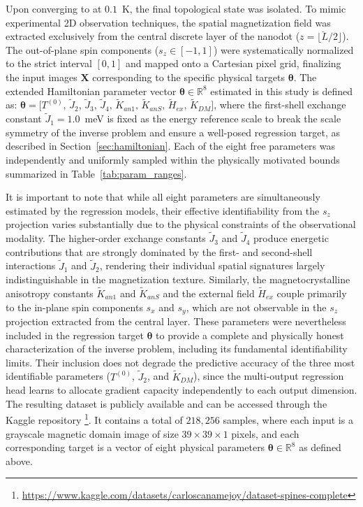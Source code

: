 \documentclass[final,5p,times,twocolumn]{elsarticle}
\begin{document}
Upon converging to  at $0.1$~K, 
the final topological state was isolated. To mimic 
experimental 2D observation techniques, the spatial 
magnetization field was extracted exclusively from the 
central discrete layer of the nanodot 
($z = \lfloor \breve{L}/2 \rfloor$). The out-of-plane 
spin components ($s_z \in [-1, 1]$) were systematically 
normalized to the strict interval $[0, 1]$ and mapped 
onto a Cartesian pixel grid, finalizing the input images 
$\mathbf{X}$ corresponding to the specific physical 
targets $\boldsymbol{\theta}$. The extended Hamiltonian 
parameter vector $\boldsymbol{\theta} \in \mathbb{R}^8$ 
estimated in this study is defined as:
$\boldsymbol{\theta} = \bigl[T^{(0)},\, \tilde{J}_2,\, 
\tilde{J}_3,\, \tilde{J}_4,\, \tilde{K}_{an1},\, 
\tilde{K}_{anS},\, \tilde{H}_{ex},\, 
\tilde{K}_{DM}\bigr]$,
where the first-shell exchange constant $\tilde{J}_1 = 
1.0$~meV is fixed as the energy reference scale to 
break the scale symmetry of the inverse problem and 
ensure a well-posed regression target, as described 
in Section~\ref{sec:hamiltonian}. Each of the eight 
free parameters was independently and uniformly sampled 
within the physically motivated bounds summarized in 
Table~\ref{tab:param_ranges}.

It is important to note that while all eight parameters 
are simultaneously estimated by the regression models, 
their effective identifiability from the $s_z$ 
projection varies substantially due to the physical 
constraints of the observational modality. The 
higher-order exchange constants $\tilde{J}_3$ and 
$\tilde{J}_4$ produce energetic contributions that are 
strongly dominated by the first- and second-shell 
interactions $\tilde{J}_1$ and $\tilde{J}_2$, rendering 
their individual spatial signatures largely 
indistinguishable in the magnetization texture. Similarly, 
the magnetocrystalline anisotropy constants 
$\tilde{K}_{an1}$ and $\tilde{K}_{anS}$ and the 
external field $\tilde{H}_{ex}$ couple primarily to 
the in-plane spin components $s_x$ and $s_y$, which 
are not observable in the $s_z$ projection extracted 
from the central layer. These parameters were 
nevertheless included in the regression target 
$\boldsymbol{\theta}$ to provide a complete and 
physically honest characterization of the inverse 
problem, including its fundamental identifiability 
limits. Their inclusion does not degrade the 
predictive accuracy of the three most identifiable 
parameters ($T^{(0)}$, $\tilde{J}_2$, and 
$\tilde{K}_{DM}$), since the multi-output regression 
head learns to allocate gradient capacity independently 
to each output dimension. The resulting dataset is 
publicly available and can be accessed through the 
Kaggle repository%
\footnote{\url{https://www.kaggle.com/datasets/carloscanamejoy/dataset-spines-complete}}. 
It contains a total of $218{,}256$ samples, where 
each input is a grayscale magnetic domain image of 
size $39 \times 39 \times 1$ pixels, and each 
corresponding target is a vector of eight physical 
parameters $\boldsymbol{\theta} \in \mathbb{R}^8$ 
as defined above.
\end{document}
